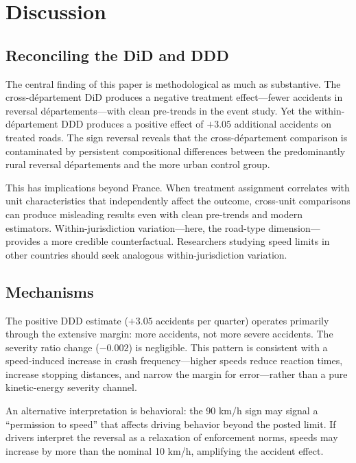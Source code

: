 \documentclass[12pt]{article}
\begin{document}
\section{Discussion} \label{sec:discussion}

\subsection{Reconciling the DiD and DDD}

The central finding of this paper is methodological as much as substantive. The cross-d\'{e}partement DiD produces a negative treatment effect---fewer accidents in reversal d\'{e}partements---with clean pre-trends in the event study. Yet the within-d\'{e}partement DDD produces a positive effect of $+3.05$ additional accidents on treated roads. The sign reversal reveals that the cross-d\'{e}partement comparison is contaminated by persistent compositional differences between the predominantly rural reversal d\'{e}partements and the more urban control group.

This has implications beyond France. When treatment assignment correlates with unit characteristics that independently affect the outcome, cross-unit comparisons can produce misleading results even with clean pre-trends and modern estimators. Within-jurisdiction variation---here, the road-type dimension---provides a more credible counterfactual. Researchers studying speed limits in other countries should seek analogous within-jurisdiction variation.

\subsection{Mechanisms}

The positive DDD estimate ($+3.05$ accidents per quarter) operates primarily through the extensive margin: more accidents, not more severe accidents. The severity ratio change ($-0.002$) is negligible. This pattern is consistent with a speed-induced increase in crash frequency---higher speeds reduce reaction times, increase stopping distances, and narrow the margin for error---rather than a pure kinetic-energy severity channel.

An alternative interpretation is behavioral: the 90 km/h sign may signal a ``permission to speed'' that affects driving behavior beyond the posted limit. If drivers interpret the reversal as a relaxation of enforcement norms, speeds may increase by more than the nominal 10 km/h, amplifying the accident effect.
\end{document}
